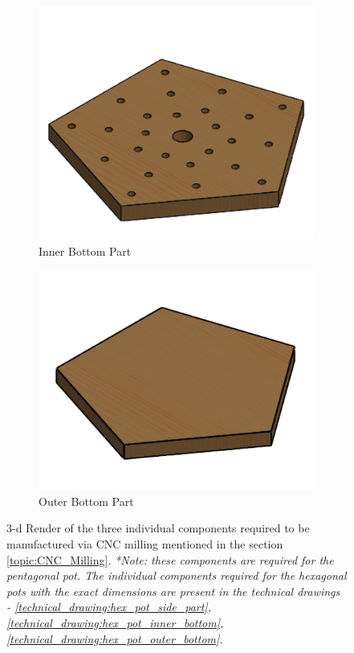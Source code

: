 \documentclass[12pt]{extarticle} %
\begin{document}
\begin{figure}[!ht]
     \hfill
     \begin{subfigure}[b]{0.35\textwidth}
         \centering
         \includegraphics[width=\textwidth]{images/screenshots/ind_pot_comp/Pentagonal false bottom-1.png}
         \caption{Inner Bottom Part}
         \label{fig:pent_pot_inner_bottom}
     \end{subfigure}
     \begin{subfigure}[b]{0.35\textwidth}
         \centering
         \includegraphics[width=\textwidth]{images/screenshots/ind_pot_comp/Pentagonal pot bottom-1.png}  
         \caption{Outer Bottom Part}
         \label{fig:pent_pot_outer_bottom}
     \end{subfigure}
     \caption{3-d Render of the three individual components required to be manufactured via CNC milling mentioned in the section \ref{topic:CNC_Milling}. \textit{*Note: these components are required for the pentagonal pot. The individual components required for the hexagonal pots with the exact dimensions are present in the technical drawings - \ref{technical_drawing:hex_pot_side_part}, \ref{technical_drawing:hex_pot_inner_bottom}, \ref{technical_drawing:hex_pot_outer_bottom}.}}
     \label{fig:ind_pot_components}
\end{figure}
\end{document}
